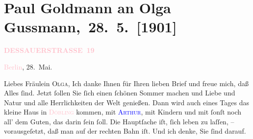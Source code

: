 

\renewcommand{\erwaehntePersonen}{Personen: Paul Goldmann, Olga Schnitzler, Elisabeth Steinrück}
\renewcommand{\erwaehnteOrte}{Orte: Berlin, Brühl, Dessauer Straße, Wien, Wörthersee, XIX., Döbling}
\renewcommand{\erwaehnteWerke}{}
\section[ Paul Goldmann an Olga Gussmann, 28. 5. {[}1901{]}]{Paul Goldmann an Olga Gussmann, 28. 5. {[}1901{]}}
\nopagebreak{}
\rehead{ }\normalsize\beginnumbering{}
\toendnotes[C]{\smallbreak\pagebreak[2]}
\toendnotes[C]{\smallbreak}
\pstart
           \noindent{}\raggedleft{}{\pb}\textcolor{gray}{\textbf{\textcolor{pink}{DESSAUERSTRASSE 19}{}\ledrightnote{\textcolor{pink}{Dessauer Straße}}}}\pend
           
\pstart
           \textcolor{pink}{Berlin}{}\ledrightnote{\textcolor{pink}{Berlin}}, 28. Mai.\pend
           
\pstart\center{}Liebes Fräulein \textsc{Olga},\pend
\pstart
           Ich danke Ihnen für Ihren lieben Brief und freue mich, daß Alles \label{K_L03528-1v}\label{K_L03528-1h} ſind. Jetzt ſollen Sie ſich einen ſchönen Sommer machen und Liebe
               und Natur und alle Herrlichkeiten der Welt genießen. Dann wird auch eines Tages das
               kleine Haus in \textsc{\textcolor{pink}{Döbling}{}\ledrightnote{\textcolor{pink}{XIX., Döbling}}} kommen, mit \textsc{\textcolor{blue}{Arthur}{}\ledrightnote{}}, mit Kindern und mit {\pb}ſonſt noch all’ dem
               Guten, das darin ſein ſoll. Die Hauptſache iſt, ſich leben zu laſſen, –
               vorausgeſetzt, daß man auf der rechten Bahn iſt. Und ich denke, Sie ſind darauf.\pend
           
